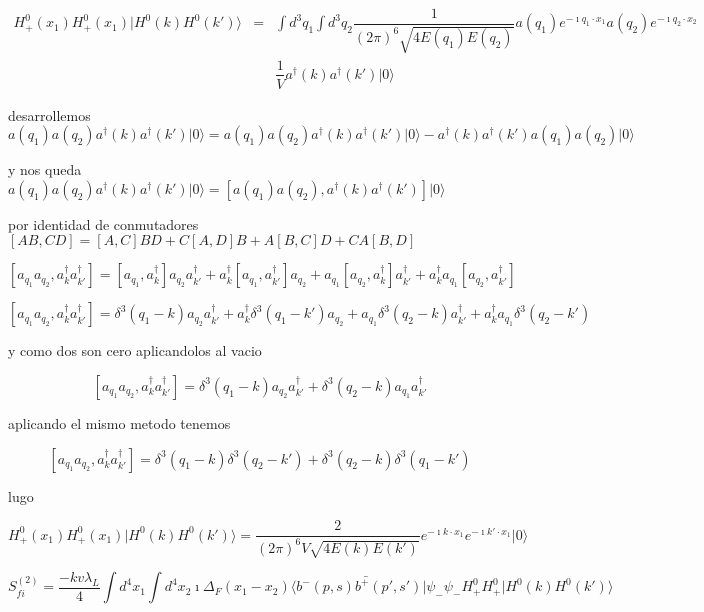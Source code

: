 \begin{eqnarray*}
H_{+}^{0}(x_{1})H_{+}^{0}(x_{1})\vert H^{0}(k)H^{0}(k')\rangle & = & \int d^{3}q_{1}\int d^{3}q_{2}\dfrac{1}{(2\pi)^{6}\sqrt{4E(q_{1})E(q_{2})}}a(q_{1})e^{-\imath q_{1}\cdot x_{1}}a(q_{2})e^{-\imath q_{2}\cdot x_{2}}\\
 &  & \dfrac{1}{V}a^{\dagger}(k)a^{\dagger}(k')\vert0\rangle\end{eqnarray*}


desarrollemos $a(q_{1})a(q_{2})a^{\dagger}(k)a^{\dagger}(k')\vert0\rangle=a(q_{1})a(q_{2})a^{\dagger}(k)a^{\dagger}(k')\vert0\rangle-a^{\dagger}(k)a^{\dagger}(k')a(q_{1})a(q_{2})\vert0\rangle$

y nos queda $a(q_{1})a(q_{2})a^{\dagger}(k)a^{\dagger}(k')\vert0\rangle=\left[a(q_{1})a(q_{2}),a^{\dagger}(k)a^{\dagger}(k')\right]\vert0\rangle$

por identidad de conmutadores $\left[AB,CD\right]=\left[A,C\right]BD+C\left[A,D\right]B+A\left[B,C\right]D+CA\left[B,D\right]$

\[
\left[a_{q_{1}}a_{q_{2}},a_{k}^{\dagger}a_{k'}^{\dagger}\right]=\left[a_{q_{1}},a_{k}^{\dagger}\right]a_{q_{2}}a_{k'}^{\dagger}+a_{k}^{\dagger}\left[a_{q_{1}},a_{k'}^{\dagger}\right]a_{q_{2}}+a_{q_{1}}\left[a_{q_{2}},a_{k}^{\dagger}\right]a_{k'}^{\dagger}+a_{k}^{\dagger}a_{q_{1}}\left[a_{q_{2}},a_{k'}^{\dagger}\right]\]


\[
\left[a_{q_{1}}a_{q_{2}},a_{k}^{\dagger}a_{k'}^{\dagger}\right]=\delta^{3}(q_{1}-k)a_{q_{2}}a_{k'}^{\dagger}+a_{k}^{\dagger}\delta^{3}(q_{1}-k')a_{q_{2}}+a_{q_{1}}\delta^{3}(q_{2}-k)a_{k'}^{\dagger}+a_{k}^{\dagger}a_{q_{1}}\delta^{3}(q_{2}-k')\]


y como dos son cero aplicandolos al vacio

\[
\left[a_{q_{1}}a_{q_{2}},a_{k}^{\dagger}a_{k'}^{\dagger}\right]=\delta^{3}(q_{1}-k)a_{q_{2}}a_{k'}^{\dagger}+\delta^{3}(q_{2}-k)a_{q_{1}}a_{k'}^{\dagger}\]


aplicando el mismo metodo tenemos 

\[
\left[a_{q_{1}}a_{q_{2}},a_{k}^{\dagger}a_{k'}^{\dagger}\right]=\delta^{3}(q_{1}-k)\delta^{3}(q_{2}-k')+\delta^{3}(q_{2}-k)\delta^{3}(q_{1}-k')\]


lugo 

\[
H_{+}^{0}(x_{1})H_{+}^{0}(x_{1})\vert H^{0}(k)H^{0}(k')\rangle=\dfrac{2}{(2\pi)^{6}V\sqrt{4E(k)E(k')}}e^{-\imath k\cdot x_{1}}e^{-\imath k'\cdot x_{1}}\vert0\rangle\]


\[
S_{fi}^{(2)}=\dfrac{-kv\lambda_{L}}{4}\int d^{4}x_{1}\int d^{4}x_{2}\imath\Delta_{F}(x_{1}-x_{2})\langle\bar{b^{-}(p,s)b^{+}(p',s')\vert\psi}_{-}\psi_{-}H_{+}^{0}H_{+}^{0}\vert H^{0}(k)H^{0}(k')\rangle\]



